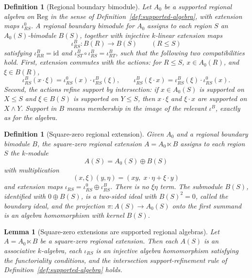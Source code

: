 \documentclass[11pt]{article}
\newtheorem{lemma}[theorem]{Lemma}
\newtheorem{definition}[theorem]{Definition}
\newcommand{\Reg}{\mathrm{Reg}}
\begin{document}
\begin{definition}[Regional boundary bimodule]
\label{def:boundary-bimodule}
Let \(A_0\) be a supported regional algebra on \(\Reg\) in the sense of Definition~\ref{def:supported-algebra}, with extension maps \(\iota^0_{RS}\). A regional boundary bimodule for \(A_0\) assigns to each region \(S\) an \(A_0(S)\)-bimodule \(B(S)\), together with injective \(k\)-linear extension maps
\[
\iota^B_{RS}:B(R)\to B(S)
\qquad(R\leq S)
\]
satisfying \(\iota^B_{RR}=\mathrm{id}\) and \(\iota^B_{ST}\circ\iota^B_{RS}=\iota^B_{RT}\), such that the following two compatibilities hold. First, extension commutes with the actions: for \(R\leq S\), \(x\in A_0(R)\), and \(\xi\in B(R)\),
\[
\iota^B_{RS}(x\cdot\xi)=\iota^0_{RS}(x)\cdot\iota^B_{RS}(\xi),
\qquad
\iota^B_{RS}(\xi\cdot x)=\iota^B_{RS}(\xi)\cdot\iota^0_{RS}(x).
\]
Second, the actions refine support by intersection: if \(x\in A_0(S)\) is supported on \(X\leq S\) and \(\xi\in B(S)\) is supported on \(Y\leq S\), then \(x\cdot\xi\) and \(\xi\cdot x\) are supported on \(X\wedge Y\). Support in \(B\) means membership in the image of the relevant \(\iota^B\), exactly as for the algebra.
\end{definition}

\begin{definition}[Square-zero regional extension]
\label{def:square-zero}
Given \(A_0\) and a regional boundary bimodule \(B\), the square-zero regional extension \(A=A_0\ltimes B\) assigns to each region \(S\) the \(k\)-module
\[
A(S)=A_0(S)\oplus B(S)
\]
with multiplication
\[
(x,\xi)(y,\eta)=(xy,\;x\cdot\eta+\xi\cdot y)
\]
and extension maps \(\iota_{RS}=\iota^0_{RS}\oplus\iota^B_{RS}\). There is no \(\xi\eta\) term. The submodule \(B(S)\), identified with \(0\oplus B(S)\), is a two-sided ideal with \(B(S)^2=0\), called the boundary ideal, and the projection \(\pi:A(S)\to A_0(S)\) onto the first summand is an algebra homomorphism with kernel \(B(S)\).
\end{definition}

\begin{lemma}[Square-zero extensions are supported regional algebras]
\label{lem:square-zero-supported}
Let \(A=A_0\ltimes B\) be a square-zero regional extension. Then each \(A(S)\) is an associative \(k\)-algebra, each \(\iota_{RS}\) is an injective algebra homomorphism satisfying the functoriality conditions, and the intersection support-refinement rule of Definition~\ref{def:supported-algebra} holds.
\end{lemma}
\end{document}
